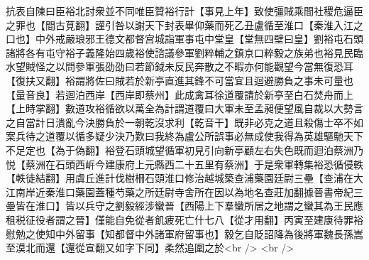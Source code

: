 抗表自陳曰臣裕北討衆並不同唯臣贊裕行計【事見上年】致使彊賊乘間社稷危逼臣之罪也【間古莧翻】謹引咎以謝天下封表畢仰藥而死乙丑盧循至淮口【秦淮入江之口也】中外戒嚴琅邪王德文都督宫城詣軍事屯中堂皇【堂無四壁曰皇】劉裕屯石頭諸將各有屯守裕子義隆始四歲裕使諮議參軍劉粹輔之鎮京口粹毅之族弟也裕見民臨水望賊怪之以問參軍張劭劭曰若節鉞未反民奔散之不暇亦何能觀望今當無復恐耳【復扶又翻】裕謂將佐曰賊若於新亭直進其鋒不可當宜且迴避勝負之事未可量也【量音良】若迴泊西岸【西岸即蔡州】此成禽耳徐道覆請於新亭至白石焚舟而上【上時掌翻】數道攻裕循欲以萬全為計謂道覆曰大軍未至孟昶便望風自裁以大勢言之自當計日潰亂今決勝負於一朝乾沒求利【乾音干】既非必克之道且殺傷士卒不如案兵待之道覆以循多疑少決乃歎曰我終為盧公所誤事必無成使我得為英雄驅馳天下不足定也【為于偽翻】裕登石頭城望循軍初見引向新亭顧左右失色既而迴泊蔡洲乃悦【蔡洲在石頭西㟁今建康府上元縣西二十五里有蔡洲】于是衆軍轉集裕恐循侵軼【軼徒結翻】用虞丘進計伐樹柵石頭淮口修治越城築查浦藥園廷尉三壘【查浦在大江南岸近秦淮口藥園蓋種芍藥之所廷尉寺舍所在因以為地名查莊加翻據晉書帝紀三壘皆在淮口】皆以兵守之劉毅經涉蠻晉【西陽上下羣蠻所居之地謂之蠻其為王民應租税征役者謂之晉】僅能自免從者飢疲死亡什七八【從才用翻】丙寅至建康待罪裕慰勉之使知中外留事【知都督中外諸軍府留事也】毅乞自貶詔降為後將軍魏長孫嵩至漠北而還【還從宣翻又如字下同】柔然追圍之於<br />
<br />
